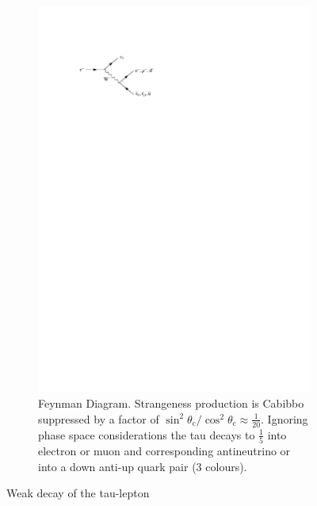 \begin{figure}[ht]
\begin{subfigure}[b]{0.47\textwidth}
    \includegraphics{./figures/theory/tau_decay_feynman.pdf}
    \caption{Feynman Diagram. Strangeness production is Cabibbo suppressed by a
      factor of $\sin^2\theta_\mathrm{c} / \cos^2\theta_\mathrm{c} \approx
      \frac{1}{20}$. Ignoring phase space considerations the tau decays to
      $\frac{1}{5}$ into electron or muon and corresponding antineutrino or into
      a down anti-up quark pair (3 colours).}
  \end{subfigure}
  \caption{Weak decay of the tau-lepton}
\end{figure}

